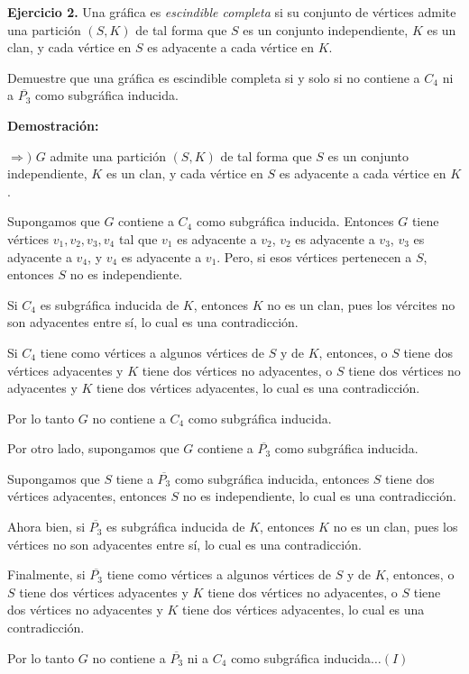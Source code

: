 \textbf{Ejercicio 2.} Una gráfica es \textit{escindible completa} si su conjunto de
vértices admite una partición $(S,K)$ de tal forma que $S$ es un conjunto 
independiente, $K$ es un clan, y cada vértice en $S$ es adyacente a cada vértice 
en $K$.

Demuestre que una gráfica es escindible completa si y solo si no contiene a 
$C_4$ ni a $\overline{P_3}$ como subgráfica inducida.

\textbf{Demostración:}

$\Rightarrow)$ $G$ admite una partición $(S,K)$ de tal forma que $S$ es un 
conjunto independiente, $K$ es un clan, y cada vértice en $S$ es adyacente a 
cada vértice en $K$. 

Supongamos que $G$ contiene a $C_4$ como subgráfica inducida. Entonces $G$ tiene 
vértices $v_1, v_2, v_3, v_4$ tal que $v_1$ es adyacente a $v_2$, $v_2$ es adyacente 
a $v_3$, $v_3$ es adyacente a $v_4$, y $v_4$ es adyacente a $v_1$. Pero, si esos 
vértices pertenecen a $S$, entonces $S$ no es independiente. 

Si $C_4$ es subgráfica inducida de $K$, entonces $K$ no es un clan, pues 
los vércites no son adyacentes entre sí, lo cual es una contradicción. 

Si $C_4$ tiene como vértices a algunos vértices de $S$ y de $K$, entonces, 
o $S$ tiene dos vértices adyacentes y $K$ tiene dos vértices no adyacentes, o $S$ 
tiene dos vértices no adyacentes y $K$ tiene dos vértices adyacentes, lo cual es una 
contradicción.

Por lo tanto $G$ no contiene a $C_4$ como subgráfica inducida.

Por otro lado, supongamos que $G$ contiene a $\overline{P_3}$ como subgráfica inducida.

Supongamos que $S$ tiene a $\overline{P_3}$ como subgráfica inducida, entonces $S$ tiene 
dos vértices adyacentes, entonces $S$ no es independiente, lo cual es una contradicción.

Ahora bien, si $\overline{P_3}$ es subgráfica inducida de $K$, entonces $K$ no es un clan, 
pues los vértices no son adyacentes entre sí, lo cual es una contradicción. 

Finalmente, si $\overline{P_3}$ tiene como vértices a algunos vértices de $S$ y de $K$, 
entonces, o $S$ tiene dos vértices adyacentes y $K$ tiene dos vértices no adyacentes, o $S$ 
tiene dos vértices no adyacentes y $K$ tiene dos vértices adyacentes, lo cual es una 
contradicción.

Por lo tanto $G$ no contiene a $\overline{P_3}$ ni a $C_4$ como subgráfica inducida$\dots(I)$


\newpage